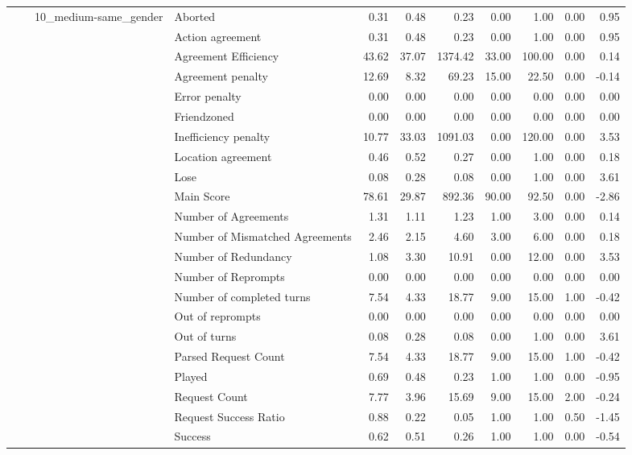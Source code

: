\begin{tabular}{llllrrrrrrr}
\cline{3-11}
 &  & \multirow[t]{27}{*}{10_medium-same_gender} & Aborted & 0.31 & 0.48 & 0.23 & 0.00 & 1.00 & 0.00 & 0.95 \\
 &  &  & Action agreement & 0.31 & 0.48 & 0.23 & 0.00 & 1.00 & 0.00 & 0.95 \\
 &  &  & Agreement Efficiency & 43.62 & 37.07 & 1374.42 & 33.00 & 100.00 & 0.00 & 0.14 \\
 &  &  & Agreement penalty & 12.69 & 8.32 & 69.23 & 15.00 & 22.50 & 0.00 & -0.14 \\
 &  &  & Error penalty & 0.00 & 0.00 & 0.00 & 0.00 & 0.00 & 0.00 & 0.00 \\
 &  &  & Friendzoned & 0.00 & 0.00 & 0.00 & 0.00 & 0.00 & 0.00 & 0.00 \\
 &  &  & Inefficiency penalty & 10.77 & 33.03 & 1091.03 & 0.00 & 120.00 & 0.00 & 3.53 \\
 &  &  & Location agreement & 0.46 & 0.52 & 0.27 & 0.00 & 1.00 & 0.00 & 0.18 \\
 &  &  & Lose & 0.08 & 0.28 & 0.08 & 0.00 & 1.00 & 0.00 & 3.61 \\
 &  &  & Main Score & 78.61 & 29.87 & 892.36 & 90.00 & 92.50 & 0.00 & -2.86 \\
 &  &  & Number of Agreements & 1.31 & 1.11 & 1.23 & 1.00 & 3.00 & 0.00 & 0.14 \\
 &  &  & Number of Mismatched Agreements & 2.46 & 2.15 & 4.60 & 3.00 & 6.00 & 0.00 & 0.18 \\
 &  &  & Number of Redundancy & 1.08 & 3.30 & 10.91 & 0.00 & 12.00 & 0.00 & 3.53 \\
 &  &  & Number of Reprompts & 0.00 & 0.00 & 0.00 & 0.00 & 0.00 & 0.00 & 0.00 \\
 &  &  & Number of completed turns & 7.54 & 4.33 & 18.77 & 9.00 & 15.00 & 1.00 & -0.42 \\
 &  &  & Out of reprompts & 0.00 & 0.00 & 0.00 & 0.00 & 0.00 & 0.00 & 0.00 \\
 &  &  & Out of turns & 0.08 & 0.28 & 0.08 & 0.00 & 1.00 & 0.00 & 3.61 \\
 &  &  & Parsed Request Count & 7.54 & 4.33 & 18.77 & 9.00 & 15.00 & 1.00 & -0.42 \\
 &  &  & Played & 0.69 & 0.48 & 0.23 & 1.00 & 1.00 & 0.00 & -0.95 \\
 &  &  & Request Count & 7.77 & 3.96 & 15.69 & 9.00 & 15.00 & 2.00 & -0.24 \\
 &  &  & Request Success Ratio & 0.88 & 0.22 & 0.05 & 1.00 & 1.00 & 0.50 & -1.45 \\
 &  &  & Success & 0.62 & 0.51 & 0.26 & 1.00 & 1.00 & 0.00 & -0.54 \\

\end{tabular}
